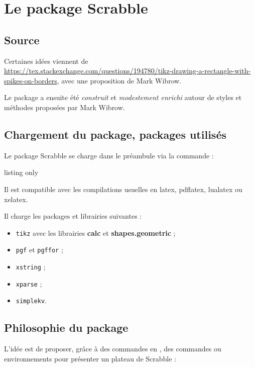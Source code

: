 \documentclass{article}
\newcommand\Cle[1]{{\bfseries\sffamily\textlangle #1\textrangle}}
\begin{document}
\section{Le package Scrabble}

\subsection{Source}

Certaines idées viennent de \url{https://tex.stackexchange.com/questions/194780/tikz-drawing-a-rectangle-with-spikes-on-borders}, avec une proposition de Mark Wibrow.

\smallskip

Le package a ensuite été \textit{construit} et \textit{modestement enrichi} autour de styles et méthodes proposées par Mark Wibrow.

\subsection{Chargement du package, packages utilisés}

Le package \textsf{Scrabble} se charge dans le préambule via la commande :

\begin{PresentationCode}{listing only}
\usepackage[fr]{Scrabble}
\end{PresentationCode}

Il est compatible avec les compilations usuelles en \textsf{latex}, \textsf{pdflatex}, \textsf{lualatex} ou \textsf{xelatex}.

\medskip

Il charge les packages et librairies suivantes :

\begin{itemize}
	\item \texttt{tikz} avec les librairies \Cle{calc} et \Cle{shapes.geometric} ;
	\item \texttt{pgf} et \texttt{pgffor} ;
	\item \texttt{xstring} ;
	\item \texttt{xparse} ;
	\item \texttt{simplekv}.
\end{itemize}

\subsection{\og Philosophie \fg{} du package}

L'idée est de proposer, grâce à des commandes en \TikZ, des commandes ou environnements pour présenter un plateau de Scrabble\texttrademark{} :
\end{document}
